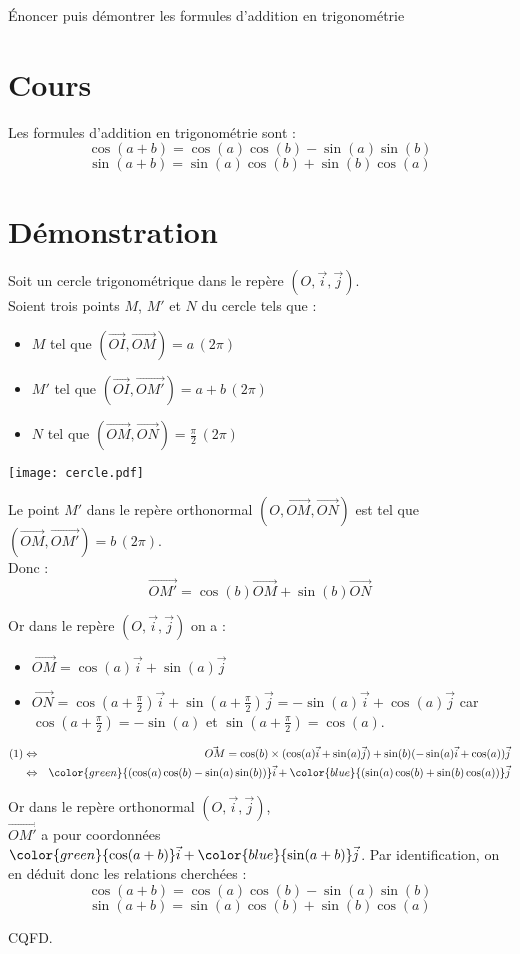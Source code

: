 Énoncer puis démontrer les formules d'addition en trigonométrie

\section{Cours}
Les formules d'addition en trigonométrie sont :
$$\cos(a + b) = \cos(a)\cos(b) - \sin(a)\sin(b)$$
$$\sin(a + b) = \sin(a)\cos(b) + \sin(b)\cos(a)$$

\section{Démonstration}
Soit un cercle trigonométrique dans le repère $(O, \vec{i}, \vec{j})$.\\
Soient trois points $M$, $M'$ et $N$ du cercle tels que :
\begin{itemize}
    \item $M$ tel que $(\vec{OI}, \vec{OM}) = a\,(2\pi)$
    \item $M'$ tel que $(\vec{OI}, \vec{OM'}) = a + b\,(2\pi)$
    \item $N$ tel que $(\vec{OM}, \vec{ON}) = \frac{\pi}{2}\,(2\pi)$
\end{itemize}
    
    \begin{center}
        \texttt{[image: cercle.pdf]}
    \end{center}
Le point $M'$ dans le repère orthonormal $(O, \vec{OM}, \vec{ON})$ est tel que $(\vec{OM}, \vec{OM'}) = b\,(2\pi)$.\\
Donc :
\begin{equation}
    \label{vec-OM}
    \vec{OM'} = \cos(b)\vec{OM} + \sin(b)\vec{ON}
\end{equation}

Or dans le repère $(O, \vec{i}, \vec{j})$ on a :
\begin{itemize}
    \item $\vec{OM} = \cos(a)\vec{i} + \sin(a)\vec{j}$
    \item $\vec{ON} = \cos(a + \frac{\pi}{2})\vec{i} + \sin(a + \frac{\pi}{2})\vec{j} = -\sin(a)\vec{i} + \cos(a)\vec{j}$ car $\cos(a + \frac{\pi}{2}) = -\sin(a)$ et $\sin(a + \frac{\pi}{2}) = \cos(a)$.
\end{itemize}

\begin{eqnarray}
   (1) & \Leftrightarrow & \vec{OM} = \cos(b) \times (\cos(a)\vec{i} + \sin(a)\vec{j}) + \sin(b)(-\sin(a)\vec{i} + \cos(a))\vec{j} \\
    & \Leftrightarrow & \color{green}{(\cos(a)\cos(b) - \sin(a)\sin(b))}\vec{i} + \color{blue}{(\sin(a)\cos(b) + \sin(b)\cos(a))}\vec{j}
\end{eqnarray}

Or dans le repère orthonormal $(O, \vec{i}, \vec{j})$,\\
$\vec{OM'}$ a pour coordonnées $\color{green}{\cos(a + b)}\vec{i} + \color{blue}{\sin(a+b)}\vec{j}$.
Par identification, on en déduit donc les relations cherchées :
$$\cos(a + b) = \cos(a)\cos(b) - \sin(a)\sin(b)$$
$$\sin(a + b) = \sin(a)\cos(b) + \sin(b)\cos(a)$$
    
CQFD.
